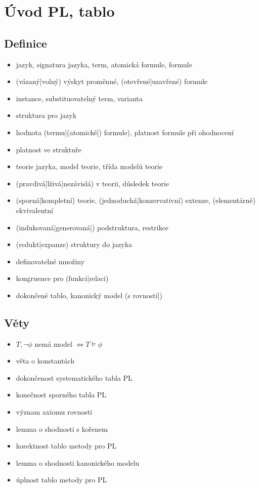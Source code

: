 \documentclass[a4paper]{article}
\begin{document}
\pagebreak

\section{Úvod PL, tablo}

\subsection{Definice}
\begin{itemize}
\item jazyk, signatura jazyka, term, atomická formule, formule
\item (vázaný|volný) výskyt proměnné, (otevřené|uzavřené) formule
\item instance, substituovatelný term, varianta
\item struktura pro jazyk
\item hodnota (termu|(atomické|) formule), platnost formule při ohodnocení
\item platnost ve struktuře
\item teorie jazyka, model teorie, třída modelů teorie
\item (pravdivá|lživá|nezávislá) v teorii, důsledek teorie
\item (sporná|kompletní) teorie, (jednoduchá|konzervativní) extenze, (elementárně) ekvivalentní
\item (indukovaná|generovaná|) podstruktura, restrikce
\item (redukt|expanze) struktury do jazyka
\item definovatelné množiny
\item kongruence pro (funkci|relaci)
\item dokončené tablo, kanonický model (s rovností|)
\end{itemize}

\subsection{Věty}
\begin{itemize}
\item $T, \neg \phi $ nemá model $ \Leftrightarrow T \models \phi$
\item věta o konstantách
\item dokončenost systematického tabla PL
\item konečnost sporného tabla PL
\item význam axiomu rovnosti
\item lemma o shodnosti s kořenem
\item korektnost tablo metody pro PL
\item lemma o shodnosti kanonického modelu
\item úplnost tablo metody pro PL
\end{itemize}
\end{document}

